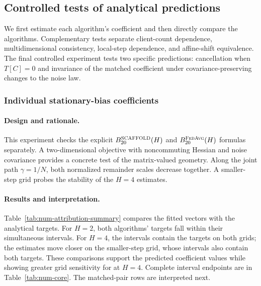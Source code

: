 \subsection{Controlled tests of analytical predictions}
\label{sec:num-controlled}

We first estimate each algorithm's coefficient and then directly compare
the algorithms. Complementary tests separate client-count dependence,
multidimensional consistency, local-step dependence, and affine-shift
equivalence. The final controlled experiment tests two specific predictions:
cancellation when $T[C]=0$ and invariance of the matched coefficient under
covariance-preserving changes to the noise law.

\subsubsection{Individual stationary-bias coefficients}
\label{sec:num-coefficients}

\paragraph{Design and rationale.}
This experiment checks the explicit $B_{20}^{\textnormal{\textsc{SCAFFOLD}}}(H)$ and
$B_{20}^{\textnormal{\textsc{FedAvg}}}(H)$ formulas separately. A two-dimensional objective
with noncommuting Hessian and noise covariance provides a concrete test of
the matrix-valued geometry. Along the joint path $\gamma=1/N$, both
normalized remainder scales decrease together. A smaller-step grid probes
the stability of the $H=4$ estimates.

\paragraph{Results and interpretation.}
Table~\ref{tab:num-attribution-summary} compares the fitted vectors with
the analytical targets. For $H=2$, both algorithms' targets fall within
their simultaneous intervals. For $H=4$, the \FedAvg{} intervals contain
the targets on both grids; the \Scaf{} estimates move closer on the
smaller-step grid, whose intervals also contain both targets. These
comparisons support the predicted coefficient values while showing greater
grid sensitivity for \Scaf{} at $H=4$. Complete interval endpoints are in
Table~\ref{tab:num-core}. The matched-pair rows are interpreted next.

